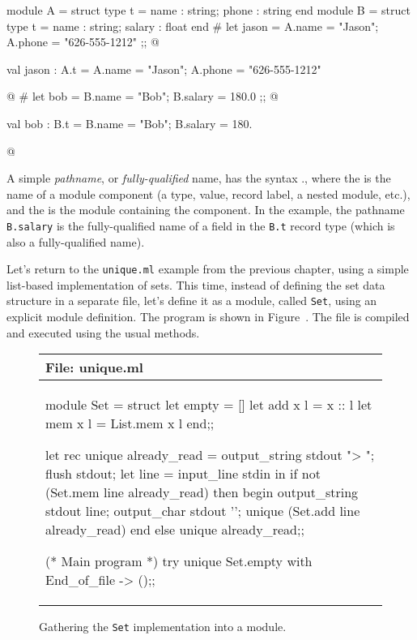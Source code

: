 \begin{ocaml}
module A = struct
    type t = { name : string; phone : string }
end
module B = struct
    type t = { name : string; salary : float }
end
# let jason = { A.name = "Jason"; A.phone = "626-555-1212" };;
@
\begin{topoutput}
val jason : A.t = {A.name = "Jason"; A.phone = "626-555-1212"}
\end{topoutput}
@
# let bob = { B.name = "Bob"; B.salary = 180.0 };;
@
\begin{topoutput}
val bob : B.t = {B.name = "Bob"; B.salary = 180.}
\end{topoutput}
@
\end{ocaml}
%
A simple \emph{pathname}, or \emph{fully-qualified} name, has the
syntax ., where the  is
the name of a module component (a type, value, record label, a nested
module, etc.), and the  is the module containing the
component.  In the example, the pathname \hbox{\lstinline$B.salary$}
is the fully-qualified name of a field in the \hbox{\lstinline$B.t$}
record type (which is also a fully-qualified name).

Let's return to the \hbox{\lstinline/unique.ml/} example from the
previous chapter, using a simple list-based implementation of
sets. This time, instead of defining the set data structure in a
separate file, let's define it as a module,
called \hbox{\lstinline/Set/}, using an explicit module
definition. The program is shown in Figure~.  The
file is compiled and executed using the usual methods.

\begin{figure}
\begin{center}
\begin{tabular}[t]{l}
File: unique.ml\\
\hline
\begin{ocamllisting}
module Set = struct
   let empty = []
   let add x l = x :: l
   let mem x l = List.mem x l
end;;

let rec unique already_read =
   output_string stdout "> ";
   flush stdout;
   let line = input_line stdin in
      if not (Set.mem line already_read) then begin
         output_string stdout line;
         output_char stdout '\n';
         unique (Set.add line already_read)
      end else
         unique already_read;;

(* Main program *)
try unique Set.empty with
   End_of_file ->
      ();;
\end{ocamllisting}
\end{tabular}
\end{center}
\caption{Gathering the \hbox{\lstinline$Set$} implementation into a module.}
\end{figure}

